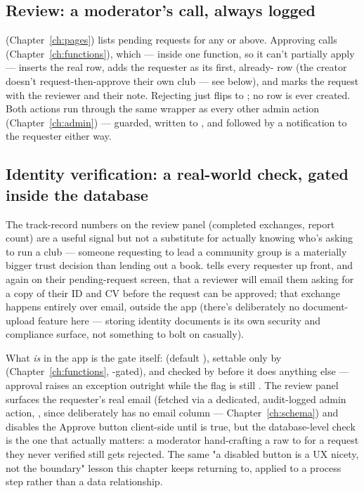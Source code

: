 \subsection*{Review: a moderator's call, always logged}

 (Chapter~\ref{ch:pages}) lists pending requests for any  or above. Approving calls  (Chapter~\ref{ch:functions}), which — inside one  function, so it can't partially apply — inserts the real  row, adds the requester as its first, already-  row (the creator doesn't request-then-approve their own club — see below), and marks the request  with the reviewer and their note. Rejecting just flips  to ; no  row is ever created. Both actions run through the same  wrapper as every other admin action (Chapter~\ref{ch:admin}) — guarded, written to , and followed by a notification to the requester either way.

\subsection*{Identity verification: a real-world check, gated inside the database}

The track-record numbers on the review panel (completed exchanges, report count) are a useful signal but not a substitute for actually knowing who's asking to run a club — someone requesting to lead a community group is a materially bigger trust decision than lending out a book.  tells every requester up front, and again on their pending-request screen, that a reviewer will email them asking for a copy of their ID and CV before the request can be approved; that exchange happens entirely over email, outside the app (there's deliberately no document-upload feature here — storing identity documents is its own security and compliance surface, not something to bolt on casually).

What \emph{is} in the app is the gate itself:  (default ), settable only by  (Chapter~\ref{ch:functions}, -gated), and checked by  before it does anything else — approval raises an exception outright while the flag is still . The review panel surfaces the requester's real email (fetched via a dedicated, audit-logged admin action, , since  deliberately has no email column — Chapter~\ref{ch:schema}) and disables the Approve button client-side until  is true, but the database-level check is the one that actually matters: a moderator hand-crafting a raw  to  for a request they never verified still gets rejected. The same "a disabled button is a UX nicety, not the boundary" lesson this chapter keeps returning to, applied to a process step rather than a data relationship.

